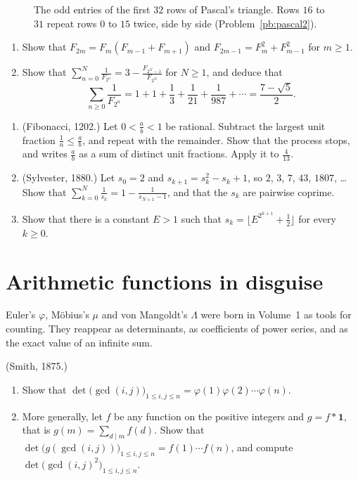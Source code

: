 \begin{figure}[ht]
\centering
{}
\caption{The odd entries of the first $32$ rows of Pascal's triangle. Rows $16$ to $31$ repeat rows $0$ to $15$ twice, side
by side (Problem~\ref{pb:pascal2}).}
\label{fig:pascal}
\end{figure}

\begin{exercise}[$\star\star$]\label{pb:millin}
\begin{enumerate}[label=(\alph*)]
\item Show that $F_{2m}=F_m(F_{m-1}+F_{m+1})$ and $F_{2m-1}=F_m^2+F_{m-1}^2$ for $m\ge1$.
\item Show that $\sum_{n=0}^N\frac1{F_{2^n}}=3-\frac{F_{2^N-1}}{F_{2^N}}$ for $N\ge1$, and deduce that
\[
\sum_{n\ge0}\frac1{F_{2^n}}=1+1+\frac13+\frac1{21}+\frac1{987}+\cdots=\frac{7-\sqrt5}2.
\]
\end{enumerate}
\end{exercise}

\begin{exercise}[$\star\star$]\label{pb:sylvester}
\begin{enumerate}[label=(\alph*)]
\item (Fibonacci, 1202.) Let $0<\frac ab<1$ be rational. Subtract the largest unit fraction $\frac1n\le\frac ab$, and repeat
with the remainder. Show that the process stops, and writes $\frac ab$ as a sum of distinct unit fractions. Apply it to
$\frac4{13}$.
\item (Sylvester, 1880.) Let $s_0=2$ and $s_{k+1}=s_k^2-s_k+1$, so $2$, $3$, $7$, $43$, $1807$, \dots Show that
$\sum_{k=0}^N\frac1{s_k}=1-\frac1{s_{N+1}-1}$, and that the $s_k$ are pairwise coprime.
\item Show that there is a constant $E>1$ such that $s_k=\bigl\lfloor E^{2^{k+1}}+\frac12\bigr\rfloor$ for every $k\ge0$.
\end{enumerate}
\end{exercise}

\section{Arithmetic functions in disguise}

Euler's $\varphi$, Möbius's $\mu$ and von Mangoldt's $\Lambda$ were born in Volume~1 as tools for counting. They reappear as
determinants, as coefficients of power series, and as the exact value of an infinite sum.

\begin{exercise}[$\star\star$]\label{pb:smith}
(Smith, 1875.)
\begin{enumerate}[label=(\alph*)]
\item Show that $\det\bigl(\gcd(i,j)\bigr)_{1\le i,j\le n}=\varphi(1)\varphi(2)\cdots\varphi(n)$.
\item More generally, let $f$ be any function on the positive integers and $g=f*\mathbf1$, that is $g(m)=\sum_{d\mid m}f(d)$.
Show that $\det\bigl(g(\gcd(i,j))\bigr)_{1\le i,j\le n}=f(1)\cdots f(n)$, and compute $\det\bigl(\gcd(i,j)^2\bigr)_{1\le i,j\le n}$.
\end{enumerate}
\end{exercise}

